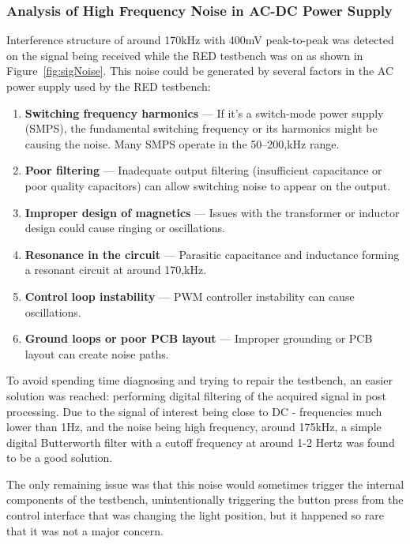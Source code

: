 \subsubsection*{Analysis of High Frequency Noise in AC-DC Power Supply}
Interference structure of around 170kHz with 400mV peak-to-peak was detected on the signal being received while the RED testbench was on as shown in Figure~\ref{fig:sigNoise}. This noise could be generated by several factors in the AC power supply used by the RED testbench:
\begin{enumerate}[label=\arabic*.]
\item \textbf{Switching frequency harmonics} --- If it's a switch-mode power supply (SMPS), the fundamental switching frequency or its harmonics might be causing the noise. Many SMPS operate in the 50--200,kHz range.
\item \textbf{Poor filtering} --- Inadequate output filtering (insufficient capacitance or poor quality capacitors) can allow switching noise to appear on the output.
\item \textbf{Improper design of magnetics} --- Issues with the transformer or inductor design could cause ringing or oscillations.
\item \textbf{Resonance in the circuit} --- Parasitic capacitance and inductance forming a resonant circuit at around 170,kHz.
\item \textbf{Control loop instability} --- PWM controller instability can cause oscillations.
\item \textbf{Ground loops or poor PCB layout} --- Improper grounding or PCB layout can create noise paths.~\cite{RefWorks:giuliattini2006prediction}
\end{enumerate}
To avoid spending time diagnosing and trying to repair the testbench, an easier solution was reached: performing digital filtering of the acquired signal in post processing. Due to the signal of interest being close to DC - frequencies much lower than 1Hz, and the noise being high frequency, around 175kHz, a simple digital Butterworth filter with a cutoff frequency at around 1-2 Hertz was found to be a good solution.

The only remaining issue was that this noise would sometimes trigger the internal components of the testbench, unintentionally triggering the button press from the control interface that was changing the light position, but it happened so rare that it was not a major concern.